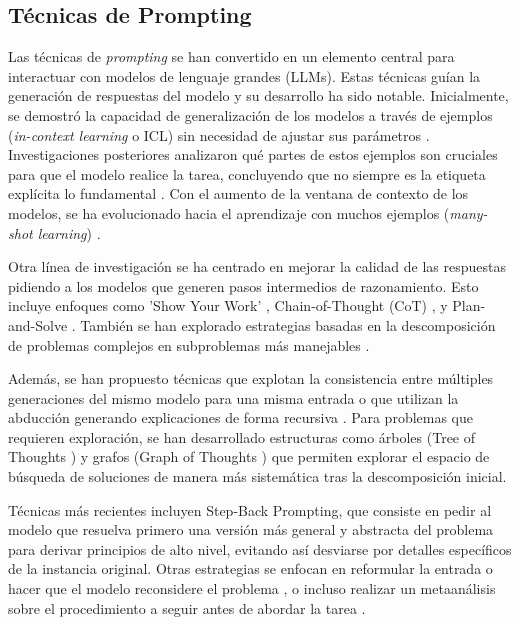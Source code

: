 \subsection{Técnicas de Prompting}\label{sec:prompting_techniques}
Las técnicas de \textit{prompting} se han convertido en un elemento central para interactuar con modelos de lenguaje grandes (LLMs). Estas técnicas guían la generación de respuestas del modelo y su desarrollo ha sido notable. Inicialmente, se demostró la capacidad de generalización de los modelos a través de ejemplos (\textit{in-context learning} o ICL) sin necesidad de ajustar sus parámetros \citep{brownLanguageModelsAre2020}. Investigaciones posteriores analizaron qué partes de estos ejemplos son cruciales para que el modelo realice la tarea, concluyendo que no siempre es la etiqueta explícita lo fundamental \citep{minRethinkingRoleDemonstrations2022}. Con el aumento de la ventana de contexto de los modelos, se ha evolucionado hacia el aprendizaje con muchos ejemplos (\textit{many-shot learning}) \citep{agarwalManyShotInContextLearning2024}.

Otra línea de investigación se ha centrado en mejorar la calidad de las respuestas pidiendo a los modelos que generen pasos intermedios de razonamiento. Esto incluye enfoques como 'Show Your Work' \citep{nyeShowYourWork2021}, Chain-of-Thought (CoT) \citep{weiChainofThoughtPromptingElicits2023, kojimaLargeLanguageModels2023}, y Plan-and-Solve \citep{wangPlanandSolvePromptingImproving2023}. También se han explorado estrategias basadas en la descomposición de problemas complejos en subproblemas más manejables \citep{fuComplexityBasedPromptingMultiStep2023, zhouLeasttoMostPromptingEnables2023}.

Además, se han propuesto técnicas que explotan la consistencia entre múltiples generaciones del mismo modelo para una misma entrada \citep{wangSelfConsistencyImprovesChain2023} o que utilizan la abducción generando explicaciones de forma recursiva \citep{jungMaieuticPromptingLogically2022}. Para problemas que requieren exploración, se han desarrollado estructuras como árboles (Tree of Thoughts \citep{yaoTreeThoughtsDeliberate2023}) y grafos (Graph of Thoughts \citep{bestaGraphThoughtsSolving2024}) que permiten explorar el espacio de búsqueda de soluciones de manera más sistemática tras la descomposición inicial.

Técnicas más recientes incluyen Step-Back Prompting, que consiste en pedir al modelo que resuelva primero una versión más general y abstracta del problema para derivar principios de alto nivel, evitando así desviarse por detalles específicos de la instancia original. Otras estrategias se enfocan en reformular la entrada o hacer que el modelo reconsidere el problema \citep{mishraReframingInstructionalPrompts2022}, o incluso realizar un metaanálisis sobre el procedimiento a seguir antes de abordar la tarea \citep{gaoMetaReasoningLarge2024}.

